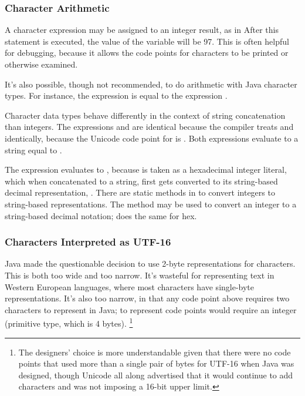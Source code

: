 \subsubsection{Character Arithmetic}

A character expression may be assigned to an integer result, as in
%
%
After this statement is executed, the value of the variable 
will be 97.  This is often helpful for debugging, because it allows
the code points for characters to be printed or otherwise examined.

It's also possible, though not recommended, to do arithmetic with Java
character types.  For instance, the expression  is equal
to the expression .

Character data types behave differently in the context of string
concatenation than integers.  The expressions  and
 are identical because the compiler treats
 and  identically, because the Unicode
code point for  is .  Both expressions
evaluate to a string equal to .  

The expression  evaluates to ,
because  is taken as a hexadecimal integer literal, which
when concatenated to a string, first gets converted to its
string-based decimal representation, .  There are static methods in
 to convert integers to string-based
representations.  The method  may be used
to convert an integer to a string-based decimal notation;
 does the same for hex.

\subsubsection{Characters Interpreted as UTF-16}

Java made the questionable decision to use 2-byte representations for
characters.  This is both too wide and too narrow.  It's wasteful for
representing text in Western European languages, where most characters
have single-byte representations.  It's also too narrow, in that
any code point above  requires two characters to
represent in Java; to represent code points would require an
integer (primitive  type, which is 4 bytes).
%
\footnote{The designers' choice is more understandable given that there were no
code points that used more than a single pair of bytes for UTF-16 when
Java was designed, though Unicode all along advertised that it would
continue to add characters and was not imposing a 16-bit upper limit.}

